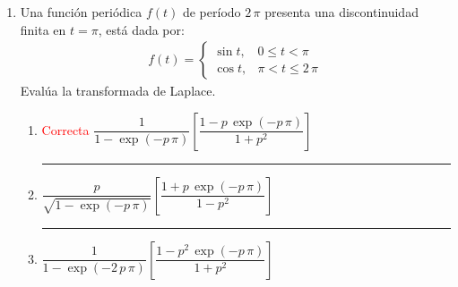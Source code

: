 \begin{enumerate}
\item Una función periódica $f(t)$ de período $2 \, \pi$ presenta una discontinuidad finita en $t = \pi$, está dada por:
\begin{align*}
f(t) = \begin{cases}
\sin t, & 0 \leq t < \pi \\
\cos t, & \pi < t \leq 2 \, \pi
\end{cases}
\end{align*} 
Evalúa la transformada de Laplace.
\begin{enumerate}[label=3.\alph*)]
\setlength\itemsep{1.5em}
\item \textcolor{red}{Correcta} $\dfrac{1}{1 - \exp(-p \, \pi)} \left[ \dfrac{1 - p \, \exp(-p \, \pi)}{1 + p^{2}} \right]$ \hrule
\item $\dfrac{p}{\sqrt{1 - \exp(-p \, \pi)}} \left[ \dfrac{1 + p \, \exp(-p \, \pi)}{1 - p^{2}} \right]$ \hrule
\item $\dfrac{1}{1 - \exp(-2\, p \, \pi)} \left[ \dfrac{1 - p^{2} \, \exp(-p \, \pi)}{1 + p^{2}} \right]$ 
\end{enumerate}
\end{enumerate}
